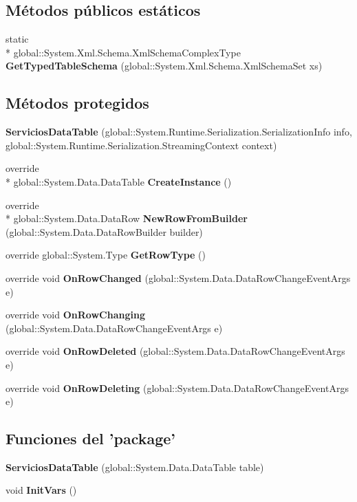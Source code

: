 \subsection*{Métodos públicos estáticos}
\begin{DoxyCompactItemize}
\item 
static \\*
global\-::\-System.\-Xml.\-Schema.\-Xml\-Schema\-Complex\-Type {\bf Get\-Typed\-Table\-Schema} (global\-::\-System.\-Xml.\-Schema.\-Xml\-Schema\-Set xs)
\end{DoxyCompactItemize}
\subsection*{Métodos protegidos}
\begin{DoxyCompactItemize}
\item 
{\bf Servicios\-Data\-Table} (global\-::\-System.\-Runtime.\-Serialization.\-Serialization\-Info info, global\-::\-System.\-Runtime.\-Serialization.\-Streaming\-Context context)
\item 
override \\*
global\-::\-System.\-Data.\-Data\-Table {\bf Create\-Instance} ()
\item 
override \\*
global\-::\-System.\-Data.\-Data\-Row {\bf New\-Row\-From\-Builder} (global\-::\-System.\-Data.\-Data\-Row\-Builder builder)
\item 
override global\-::\-System.\-Type {\bf Get\-Row\-Type} ()
\item 
override void {\bf On\-Row\-Changed} (global\-::\-System.\-Data.\-Data\-Row\-Change\-Event\-Args e)
\item 
override void {\bf On\-Row\-Changing} (global\-::\-System.\-Data.\-Data\-Row\-Change\-Event\-Args e)
\item 
override void {\bf On\-Row\-Deleted} (global\-::\-System.\-Data.\-Data\-Row\-Change\-Event\-Args e)
\item 
override void {\bf On\-Row\-Deleting} (global\-::\-System.\-Data.\-Data\-Row\-Change\-Event\-Args e)
\end{DoxyCompactItemize}
\subsection*{Funciones del 'package'}
\begin{DoxyCompactItemize}
\item 
{\bf Servicios\-Data\-Table} (global\-::\-System.\-Data.\-Data\-Table table)
\item 
void {\bf Init\-Vars} ()
\end{DoxyCompactItemize}
